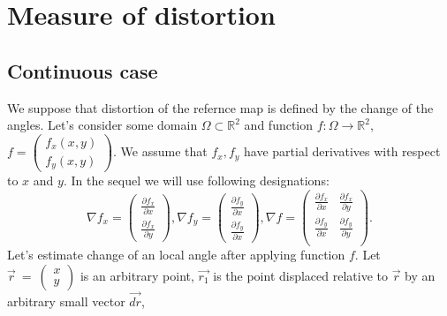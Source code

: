 \documentclass{article}
\newcommand{\vect}{\overrightarrow}
\begin{document}
\section{Measure of distortion} 
\label{sec:dist_measure}
\subsection{Continuous case}
\label{sec:continuous}
We suppose that distortion of the refernce map is defined by the change of the angles. Let's consider some domain $\Omega \subset \mathbb{R}^2$ and function $f: \Omega \to \mathbb{R}^2$, 
$f = \begin{pmatrix} f_x(x, y) \\ f_y(x, y) \end{pmatrix}$. We assume that $f_x, f_y$ have partial derivatives with respect to $x$ and $y$. In the sequel we will use following designations:
$$
  \nabla f_x = \begin{pmatrix} \frac{\partial f_x}{\partial x} \\ \frac{\partial f_x}{\partial y} \end{pmatrix}, 
  \nabla f_y = \begin{pmatrix} \frac{\partial f_y}{\partial x} \\ \frac{\partial f_y}{\partial x} \end{pmatrix}, 
  \nabla f = \begin{pmatrix} 
    \frac{\partial f_x}{\partial x} & \frac{\partial f_x}{\partial y} \\
    \frac{\partial f_y}{\partial x} & \frac{\partial f_y}{\partial y} \\
  \end{pmatrix}. 
$$
Let's estimate change of an local angle after applying function $f$. Let $\vect{r}~=~\begin{pmatrix} x \\ y \end{pmatrix}$ is an arbitrary point, $\vect{r_1}$ is the point displaced relative to $\vect{r}$ by an arbitrary 
small vector $\vect{dr}$, 
\end{document}
